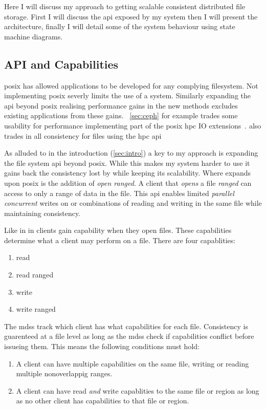 Here I will discuss my approach to getting scalable consistent distributed file storage. First I will discuss the \ac{api} exposed by my system then I will present the architecture, finally I will detail some of the system behaviour using state machine diagrams.

\subsection{API and Capabilities}
\ac{posix} has allowed applications to be developed for any complying filesystem. Not implementing \ac{posix} severly limits the use of a system. Similarly expanding the \ac{api} beyond \ac{posix} realising performance gains in the new methods excludes existing applications from these gains. \ceph{}~\cref{sec:ceph} for example trades some usability for performance implementing part of the \ac{posix} \ac{hpc} IO extensions~\cite{hpc_posix}. \ceph{} also trades in all consistency for files using the \ac{hpc} \ac{api}

As alluded to in the introduction (\cref{sec:intro}) a key to my approach is expanding the file system \ac{api} beyond posix. While this makes my system harder to use it gains back the consistency lost by \ceph{} while keeping its scalability. Where \name{} expands upon \ac{posix} is the addition of \textsl{open ranged}. A client that \textit{opens} a file \textit{ranged} can access to only a range of data in the file. This \ac{api} enables limited \emph{parallel concurrent} writes on or combinations of reading and writing in the same file while maintaining consistency.

Like in \ceph{} in \name{} clients gain capability when they open files. These capabilities determine what a client may perform on a file. There are four capablities:

\begin{enumerate}
	\item read
	\item read ranged
	\item write
	\item write ranged
\end{enumerate}

The \acp{mds} track which client has what capabilities for each file. Consistency is guarenteed at a file level as long as the \acp{mds} check if capabilities conflict before issueing them. This means the following conditions must hold:

\begin{enumerate} %
	\item A client can have multiple capabilities on the same file, writing or reading multiple nonoverlappig ranges.
	\item A client can have read \textit{and} write capablities to the same file or region as long as no other client has capabilities to that file or region.
\end{enumerate}
 





